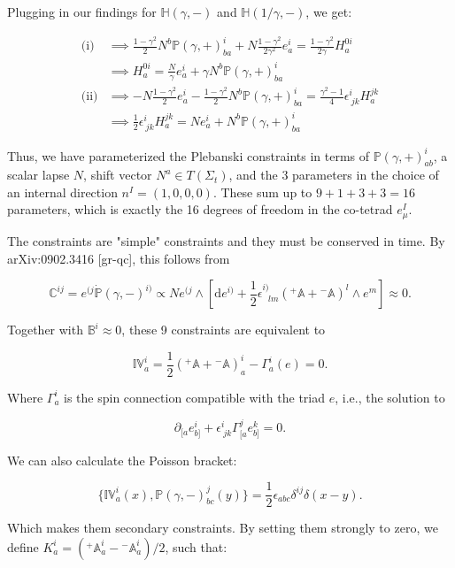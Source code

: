 \documentclass{article}
\begin{document}
Plugging in our findings for $\mathbb{H}(\gamma, -)$ and $\mathbb{H}\left(1/\gamma, -\right)$, we get:

$$
\begin{aligned}
\text{(i)} &\implies \frac{1 - \gamma^2}{2} N^b \mathbb{P}(\gamma, +)^i_{ba} + N \frac{1 - \gamma^2}{2\gamma^2} e^i_a = \frac{1-\gamma^2}{2\gamma} H^{0i}_a \\
&\implies H^{0i}_a = \frac{N}{\gamma} e^i_a + \gamma N^b \mathbb{P}(\gamma, +)^i_{ba} \\
\text{(ii)} &\implies - N \frac{1 - \gamma^2}{2} e^i_a - \frac{1 - \gamma^2}{2} N^b \mathbb{P}(\gamma, +)^i_{ba} = \frac{\gamma^2 - 1}{4} \epsilon^i_{\ jk} H^{jk}_a \\
&\implies \frac{1}{2} \epsilon^{i}_{\ jk} H^{jk}_a = N e^i_a + N^b \mathbb{P}(\gamma, +)^i_{ba}
\end{aligned}
$$

Thus, we have parameterized the Plebanski constraints in terms of $\mathbb{P}(\gamma, +)^i_{ab}$, a scalar lapse $N$, shift vector $N^a \in T(\Sigma_t)$, and the 3 parameters in the choice of an internal direction $n^I = (1, 0, 0, 0)$. These sum up to $9 + 1 + 3 + 3 = 16$ parameters, which is exactly the 16 degrees of freedom in the co-tetrad $e^I_\mu$.

The constraints are "simple" constraints and they must be conserved in time. By arXiv:0902.3416 [gr-qc], this follows from

$$
\mathbb{C}^{ij} = e^{(j} \dot{\mathbb{P}}(\gamma, -)^{i)} \propto N e^{(j}\wedge \left[\mathrm{d}e^{i)} + \frac{1}{2}\epsilon^{i)}_{\ \ \ lm}\left({}^+\mathbb{A} + {}^-\mathbb{A}\right)^l\wedge e^{m} \right]\approx 0.
$$

Together with $\mathbb{B}^i \approx 0$, these 9 constraints are equivalent to

$$
\mathbb{IV}^i_a = \frac{1}{2} ({}^{+}\mathbb{A} + {}^{-}\mathbb{A})_a^i - \Gamma_a^i(e) = 0.
$$

Where $\Gamma_a^i$ is the spin connection compatible with the triad $e$, i.e., the solution to

$$
\partial_{[a} e_{b]}^i + \epsilon^i_{\ jk} \Gamma_{[a}^j e_{b]}^k = 0.
$$

We can also calculate the Poisson bracket:

$$
\{ \mathbb{IV}^i_a(x), \mathbb{P}(\gamma, -)^j_{bc}(y) \} = \frac{1}{2} \epsilon_{abc} \delta^{ij} \delta(x-y).
$$

Which makes them secondary constraints. By setting them strongly to zero, we define $K_a^i = ({}^{+}\mathbb{A}^i_a - {}^{-}\mathbb{A}^i_a)/2$, such that:
\end{document}

